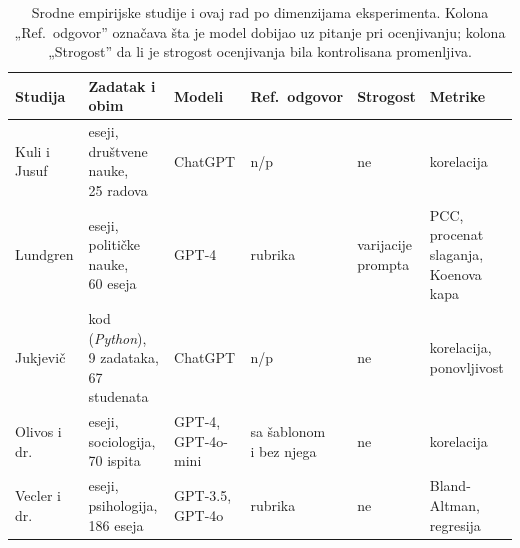 \begin{table}[ht]
\centering
\caption{Srodne empirijske studije i ovaj rad po dimenzijama eksperimenta.
Kolona „Ref.\ odgovor'' označava šta je model dobijao uz pitanje pri ocenjivanju;
kolona „Strogost'' da li je strogost ocenjivanja bila kontrolisana promenljiva.}
\label{tab:srodni-radovi}
\scriptsize
\setlength{\tabcolsep}{3pt}
\begin{tabular}{@{}llllll@{}}
\toprule
\textbf{Studija} & \textbf{Zadatak i obim} & \textbf{Modeli} & \textbf{Ref.\ odgovor} & \textbf{Strogost} & \textbf{Metrike} \\
\midrule
\makecell[l]{Kuli i Jusuf\\\cite{kooli2025transforming}} & \makecell[l]{eseji,\\društvene nauke,\\25 radova} & ChatGPT & n/p & ne & korelacija \\
\addlinespace
\makecell[l]{Lundgren\\\cite{lundgren2024large}} & \makecell[l]{eseji,\\političke nauke,\\60 eseja} & GPT-4 & rubrika & \makecell[l]{varijacije\\prompta} & \makecell[l]{PCC, procenat\\slaganja,\\Koenova kapa} \\
\addlinespace
\makecell[l]{Jukjevič\\\cite{jukiewicz2024future}} & \makecell[l]{kod (\emph{Python}),\\9 zadataka,\\67 studenata} & ChatGPT & n/p & ne & \makecell[l]{korelacija,\\ponovljivost} \\
\addlinespace
\makecell[l]{Olivos i dr.\\\cite{olivos2025assessing}} & \makecell[l]{eseji,\\sociologija,\\70 ispita} & \makecell[l]{GPT-4,\\GPT-4o-mini} & \makecell[l]{sa šablonom\\i bez njega} & ne & korelacija \\
\addlinespace
\makecell[l]{Vecler i dr.\\\cite{wetzler2025grading}} & \makecell[l]{eseji,\\psihologija,\\186 eseja} & \makecell[l]{GPT-3.5,\\GPT-4o} & rubrika & ne & \makecell[l]{Bland-Altman,\\regresija} \\

\end{tabular}
\end{table}

